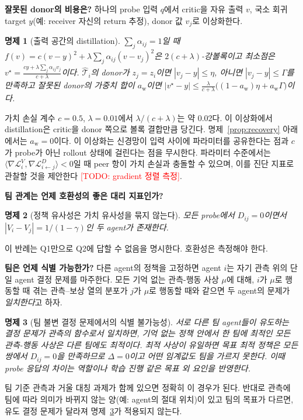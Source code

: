 \documentclass[twocolumn,10pt]{article}
\newtheorem{proposition}{명제}
\theoremstyle{remark}
\newcommand{\todo}[1]{\textcolor{red}{[TODO: #1]}}
\begin{document}
\textbf{잘못된 donor의 비용은?} 하나의 probe 입력 $q$에서 critic을 자유 출력 $v$, 국소 회귀 target $y$(예: receiver 자신의 return 추정), donor 값 $v_j$로 이상화한다.
\begin{proposition}[출력 공간의 distillation]
\label{prop:bias}
$\sum_j\alpha_{ij}=1$일 때 $f(v)=c(v-y)^2+\lambda\sum_j\alpha_{ij}(v-v_j)^2$은 $2(c+\lambda)$-강볼록이고 최소점은
$v^\star=\frac{cy+\lambda\sum_j\alpha_{ij}v_j}{c+\lambda}$이다. $\hat{\mathcal{T}}_i$의 donor가 $z_j=z_i$이면 $|v_j-y|\le\eta$, 아니면 $|v_j-y|\le\Gamma$를 만족하고 잘못된
donor의 가중치 합이 $a_{\mathrm{w}}$이면 $|v^\star-y|\le\frac{\lambda}{c+\lambda}\big((1-a_{\mathrm{w}})\eta+a_{\mathrm{w}}\Gamma\big)$이다.
\end{proposition}
가치 손실 계수 $c=0.5$, $\lambda=0.01$에서 $\lambda/(c+\lambda)$는 약 0.02다. 이 이상화에서 distillation은 critic을 donor 쪽으로 볼록 결합만큼 당긴다. 명제~\ref{prop:recovery}
아래에서는 $a_{\mathrm{w}}=0$이다. 이 이상화는 신경망이 입력 사이에 파라미터를 공유한다는 점과 $c$가 probe가 아닌 rollout 상태에 걸린다는 점을 무시한다. 파라미터 수준에서는
$\langle\nabla\mathcal{L}^V_i,\nabla\mathcal{L}^D_{i\leftarrow j}\rangle<0$일 때 peer 항이 가치 손실과 충돌할 수 있으며, 이를 진단 지표로 관찰할 것을 제안한다
\todo{gradient 정렬 측정}.

\textbf{팀 관계는 언제 호환성의 좋은 대리 지표인가?}
\begin{proposition}[정책 유사성은 가치 유사성을 묶지 않는다]
\label{prop:counter}
모든 probe에서 $D_{ij}=0$이면서 $|V_i-V_j|=1/(1-\gamma)$인 두 agent가 존재한다.
\end{proposition}
이 반례는 Q1만으로 Q2에 답할 수 없음을 명시한다. 호환성은 측정해야 한다.

\textbf{팀은 언제 식별 가능한가?} 다른 agent의 정책을 고정하면 agent $i$는 자기 관측 위의 단일 agent 결정 문제를 마주한다. 모든 기억 없는 관측-행동 사상 $\mu$에 대해,
$i$가 $\mu$로 행동할 때 겪는 관측--보상 열의 분포가 $j$가 $\mu$로 행동할 때와 같으면 두 agent의 문제가 \emph{일치한다}고 하자.
\begin{proposition}[팀 불변 결정 문제에서의 식별 불가능성]
\label{prop:nonid}
서로 다른 팀 agent들이 유도하는 결정 문제가 관측의 함수로서 일치하면, 기억 없는 정책 안에서 한 팀에 최적인 모든 관측-행동 사상은 다른 팀에도 최적이다. 최적 사상이
유일하면 목표 최적 정책은 모든 쌍에서 $D_{ij}=0$을 만족하므로 $\Delta=0$이고 어떤 임계값도 팀을 가르지 못한다. 이때 probe 응답의 차이는 역할이나 학습 진행 같은 목표 외
요인을 반영한다.
\end{proposition}
팀 기준 관측과 거울 대칭 과제가 함께 있으면 정확히 이 경우가 된다. 반대로 관측에 팀에 따라 의미가 바뀌지 않는 양(예: agent의 절대 위치)이 있고 팀의 목표가 다르면,
유도 결정 문제가 달라져 명제~\ref{prop:nonid}가 적용되지 않는다.
\end{document}
